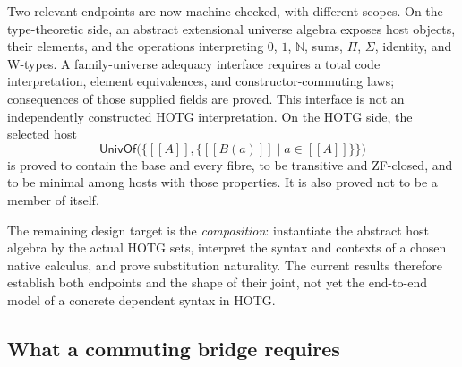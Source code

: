 \documentclass[11pt]{article}
\theoremstyle{definition}
\theoremstyle{remark}
\newcommand{\sem}[1]{[\![#1]\!]}
\begin{document}
Two relevant endpoints are now machine checked, with different scopes. On the
type-theoretic side, an abstract extensional universe algebra exposes host
objects, their elements, and the operations interpreting $0$, $1$, $\mathbb N$,
sums, $\Pi$, $\Sigma$, identity, and W-types. A family-universe adequacy
interface requires a total code interpretation, element equivalences, and
constructor-commuting laws; consequences of those supplied fields are proved.
This interface is not an independently constructed HOTG interpretation.
On the HOTG side, the selected host
\[
  \mathsf{UnivOf}\bigl(\{\sem A,
    \{\sem{B(a)}\mid a\in\sem A\}\}\bigr)
\]
is proved to contain the base and every fibre, to be transitive and ZF-closed,
and to be minimal among hosts with those properties.  It is also proved not to
be a member of itself.

The remaining design target is the \emph{composition}: instantiate the abstract
host algebra by the actual HOTG sets, interpret the syntax and contexts of a
chosen native calculus, and prove substitution naturality.  The current results
therefore establish both endpoints and the shape of their joint, not yet the
end-to-end model of a concrete dependent syntax in HOTG.

\subsection{What a commuting bridge requires}
\end{document}
